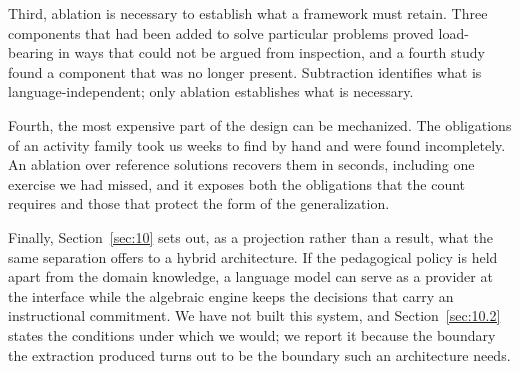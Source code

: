 \documentclass[journal]{IEEEtran}
\begin{document}
Third, ablation is necessary to establish what a framework must retain.
Three components that had been added to solve particular problems proved
load-bearing in ways that could not be argued from inspection, and a
fourth study found a component that was no longer present. Subtraction
identifies what is language-independent; only ablation establishes what
is necessary.

Fourth, the most expensive part of the design can be mechanized. The
obligations of an activity family took us weeks to find by hand and were
found incompletely. An ablation over reference solutions recovers them
in seconds, including one exercise we had missed, and it exposes both the
obligations that the count requires and those that protect the form of
the generalization.

Finally, Section~\ref{sec:10} sets out, as a projection rather than a result, what the same separation offers to a hybrid architecture. If the pedagogical policy is held apart from the domain knowledge, a language model can serve as a provider at the interface while the algebraic engine keeps the decisions that carry an instructional commitment. We have not built this system, and Section~\ref{sec:10.2} states the conditions under which we would; we report it because the boundary the extraction produced turns out to be the boundary such an architecture needs.
\end{document}
